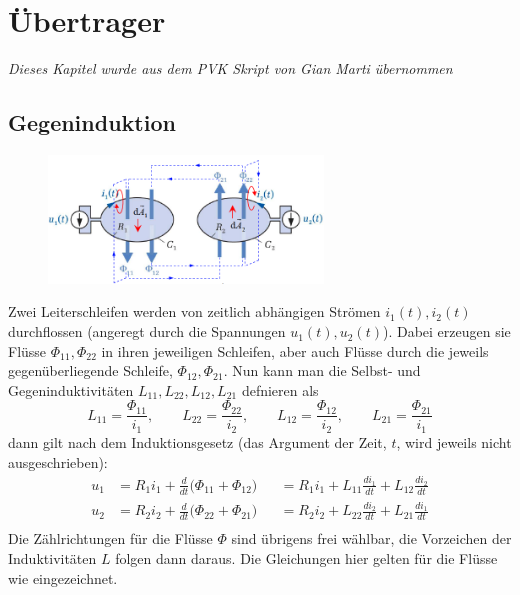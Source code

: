 \section{Übertrager}
\textit{Dieses Kapitel wurde aus dem PVK Skript von Gian Marti übernommen  }

\subsection{Gegeninduktion}
\begin{figure}[H]
	\center
	\vspace{-0.5cm}
	\includegraphics[width=0.65\textwidth]{img/Tra1}
	\vspace{-0.2cm}
\end{figure}
Zwei Leiterschleifen werden von zeitlich abhängigen Strömen $i_1(t), i_2(t)$ durchflossen (angeregt durch die Spannungen $u_1(t),u_2(t)$). Dabei erzeugen sie Flüsse $\Phi_{11}, \Phi_{22}$ in ihren jeweiligen Schleifen, aber auch Flüsse durch die jeweils gegenüberliegende Schleife, $\Phi_{12},\Phi_{21}$.
Nun kann man die Selbst- und Gegeninduktivitäten $L_{11},L_{22},L_{12},L_{21}$ defnieren als
$$L_{11} = \frac{\Phi_{11}}{i_1}, \qquad L_{22} = \frac{\Phi_{22}}{i_2}, \qquad L_{12} = \frac{\Phi_{12}}{i_2}, \qquad L_{21} = \frac{\Phi_{21}}{i_1}$$
dann gilt nach dem Induktionsgesetz (das Argument der Zeit, $t$, wird jeweils nicht ausgeschrieben):
\begin{equation*}
	\begin{alignedat}{2}
		u_1 &= R_1i_1 + \frac{d}{dt}\big(\Phi_{11}+\Phi_{12}\big) &&= R_1i_1 + L_{11}\frac{di_1}{dt}+L_{12}\frac{di_2}{dt} \\
		u_2 &= R_2i_2 + \frac{d}{dt}\big(\Phi_{22}+\Phi_{21}\big) &&= R_2i_2 + L_{22}\frac{di_2}{dt}+L_{21}\frac{di_1}{dt} \\
	\end{alignedat}
\end{equation*}
Die Zählrichtungen für die Flüsse $\Phi$ sind übrigens frei wählbar, die Vorzeichen der Induktivitäten $L$ folgen dann daraus. Die Gleichungen hier gelten für die Flüsse wie eingezeichnet. \newline


